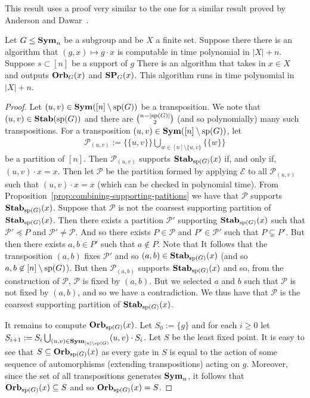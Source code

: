 \documentclass[../paper.tex]{subfiles}
\begin{document}
This result uses a proof very similar to the one for a similar result proved by
Anderson and Dawar~\cite{AndersonD17}.

\begin{lem}
\label{lem:computing-support}
  Let $G \leq \text{\textbf{Sym}}_n$ be a subgroup and be $X$ a finite set. Suppose there there is an algorithm that $(g, x) \mapsto g \cdot x$ is computable in time polynomial in $\vert X \vert + n$. Suppose  $s \subset [n]$ be a support of $g$ There is an algorithm that takes in $x \in X$ and outputs $\text{\textbf{Orb}}_G (x)$ and $\text{\textbf{SP}}_G(x)$. This algorithm runs in time polynomial in $\vert X \vert + n$.
\end{lem}
\begin{proof}
  Let $(u, v) \in \text{\textbf{Sym}}([n] \setminus \text{sp}(G))$ be a transposition. We note that $(u,v) \in \text{\textbf{Stab}}(\text{sp}(G))$ and there are ${n - \vert \text{sp}(G) \vert}\choose{2}$ (and so polynomially) many such transpositions. For a transposition $(u, v) \in \text{\textbf{Sym}} ([n] \setminus \text{sp}(G))$, let
  \begin{align*}
  \mathcal{P}_{(u,v)} := \{ \{u,v\}\} \bigcup_{w \in [n] \setminus \{ u,v \}} \{ \{ w \} \}
  \end{align*}
   be a partition of $[n]$. Then $\mathcal{P}_{(u,v)}$ supports $\text{\textbf{Stab}}_{\text{sp}(G)}(x)$ if, and only if, $(u,v) \cdot x = x$. Then let $\mathcal{P}$ be the partition formed by applying $\mathcal{E}$ to all $\mathcal{P}_{(u,v)}$ such that $(u,v) \cdot x = x$ (which can be checked in polynomial time). From Proposition~\ref{prop:combining-supporting-patitions} we have that $\mathcal{P}$ supports $\text{\textbf{Stab}}_{\text{sp}(G)}(x)$. Suppose that $\mathcal{P}$ is not the coarsest supporting partition of $\text{\textbf{Stab}}_{\text{sp}(G)}(x)$. Then there exists a partition $\mathcal{P}'$ supporting $\text{\textbf{Stab}}_{\text{sp}(G)}(x)$ such that $\mathcal{P}' \preceq P$ and $\mathcal{P}' \neq \mathcal{P}$. And so there exists $P \in \mathcal{P}$ and $P' \in \mathcal{P}'$ such that $P \subsetneq P'$. But then there exists $a , b \in P'$ such that $a \not\in P$. Note that It follows that the transposition $(a,b)$ fixes $\mathcal{P}'$ and so $(a,b) \in \text{\textbf{Stab}}_{\text{sp}(G)}(x)$ (and so $a, b \not\in [n] \setminus \text{sp}(G)$). But then $\mathcal{P}_{(a,b)}$ supports $\text{\textbf{Stab}}_{\text{sp}(G)}(x)$ and so, from the construction of $\mathcal{P}$, $\mathcal{P}$ is fixed by $(a,b)$. But we selected $a$ and $b$ such that $\mathcal{P}$ is not fixed by $(a,b)$, and so we have a contradiction. We thus have that $\mathcal{P}$ is the coarsest supporting partition of $\text{\textbf{Stab}}_{\text{sp}(G)}(x)$.

  It remains to compute $\text{\textbf{Orb}}_{\text{sp}(G)}(x)$. Let $S_0 := \{g\}$ and for each
  $i \geq 0$ let $S_{i+1} := S_i \bigcup_{(u,v) \in \text{\textbf{Sym}}_{[n] \setminus \text{sp}(G)}} (u,v)\cdot S_i$. Let  $S$ be the least fixed point. It is easy to see that $S \subseteq \text{\textbf{Orb}}_{\text{sp}(G)}(x)$ as every gate in $S$ is equal to the action of some sequence of automorphisms (extending transpositions) acting on $g$. Moreover, since the set of all transpositions generates $\text{\textbf{Sym}}_n$, it follows that $\text{\textbf{Orb}}_{\text{sp}(G)}(x) \subseteq S$ and so $\text{\textbf{Orb}}_{\text{sp}(G)}(x) = S$.


\end{proof}
\end{document}
